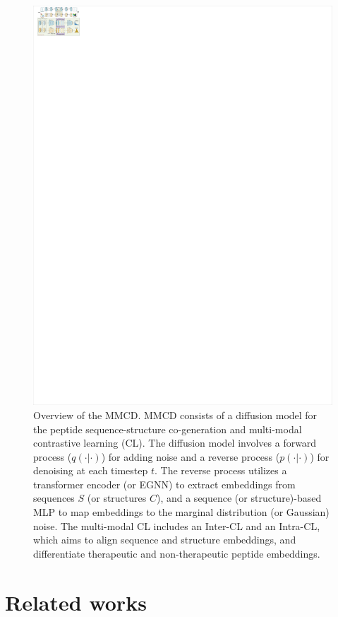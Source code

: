 \documentclass[letterpaper]{article}
\begin{document}
\begin{figure}[ht]
\centering
\includegraphics[scale=0.74]{fig1.pdf}
\caption{Overview of the MMCD. MMCD consists of a diffusion model for the peptide sequence-structure co-generation and multi-modal contrastive learning (CL). The diffusion model involves a forward process ($q(\cdot|\cdot)$) for adding noise and a reverse process ($p(\cdot|\cdot)$) for denoising at each timestep $t$. The reverse process utilizes a transformer encoder (or EGNN) to extract embeddings from sequences $S$ (or structures $C$), and a sequence (or structure)-based MLP to map embeddings to the marginal distribution (or Gaussian) noise. The multi-modal CL includes an Inter-CL and an Intra-CL, which aims to align sequence and structure embeddings, and differentiate therapeutic and non-therapeutic peptide embeddings.}
\end{figure}

\section{Related works}
\end{document}
